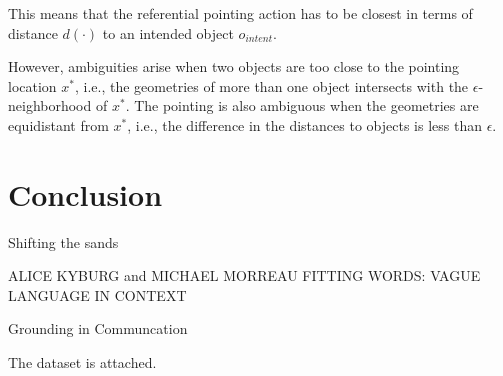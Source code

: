 This means that the referential pointing action has to be closest in terms of distance $d(\cdot)$ to an intended object $o_{intent}$. 

However, ambiguities arise when two objects are too close to the pointing location $x^*$, i.e., the geometries of more than one object intersects with the $\epsilon$-neighborhood of $x^*$. The pointing is also ambiguous when the geometries are equidistant from $x^*$, i.e., the difference in the distances to objects is less than $\epsilon$.  


\section{Conclusion}
\label{conclusion}

Shifting the sands \cite{graff2000shifting}


 ALICE KYBURG and MICHAEL MORREAU
FITTING WORDS: VAGUE LANGUAGE IN CONTEXT \cite{kyburg2000fitting}

Grounding in Communcation \cite{clark1991grounding}

The dataset is attached.